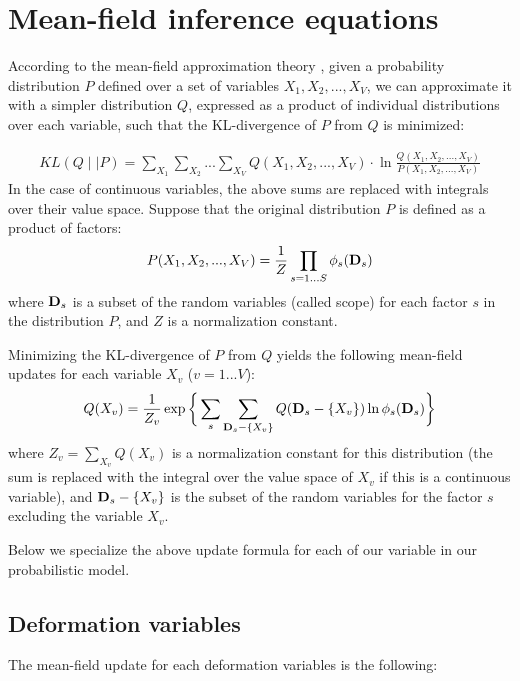 \section{Mean-field inference equations}
\label{sec:mean-field-appendix}

According to the mean-field approximation theory \cite{Koller09}, given a probability distribution $P$ defined over a set of variables $X_1, X_2, ..., X_V$, we can approximate it with a simpler distribution $Q$, expressed as a product of individual distributions over each variable, such that the KL-divergence of $P$ from $Q$ is minimized: 

\begin{align*}
KL(Q \mid \mid P) = \sum\limits_{X_1}\sum\limits_{X_2}...\sum\limits_{X_V} Q(X_1, X_2, ..., X_V) \cdot \ln \frac{ Q(X_1, X_2, ..., X_V) } { P(X_1, X_2, ..., X_V) }
\end{align*}
In the case of continuous variables, the above sums are replaced with integrals over their value space. Suppose that the original distribution $P$ is defined  as a product of factors:
\begin{align*}
P(X_1, X_2, ..., X_V) = \frac{1}{Z} \prod\limits_{s=1...S} \phi_s(\mathbf{D}_s)
\end{align*}
where $\mathbf{D}_s$ is a subset of the random variables (called scope) for each factor $s$ in the distribution $P$, and $Z$ is a normalization constant. 

Minimizing the KL-divergence  of $P$ from $Q$ yields the following mean-field updates for each variable $X_v$ ($v=1...V$):
\begin{align*}
Q(X_v) = \frac{1}{Z_v} \exp \bigg\{ \sum\limits_s \sum\limits_{\mathbf{D}_s-\{X_v\}} Q( \mathbf{D}_s-\{X_v\} ) \ln \phi_s(\mathbf{D}_s) \bigg\}
\end{align*}
where $Z_v=\sum\limits_{X_v} Q(X_v)$ is a normalization constant for this distribution (the sum is replaced with the integral over the value space of $X_v$ if this is a continuous variable), and $\mathbf{D}_s-\{X_v\}$ is the subset of the random variables for the factor $s$ excluding the variable $X_v$. 

Below we specialize the above update formula for each of our variable in our probabilistic model. 


\subsection{Deformation variables}

The mean-field update for each deformation variables is the following:

